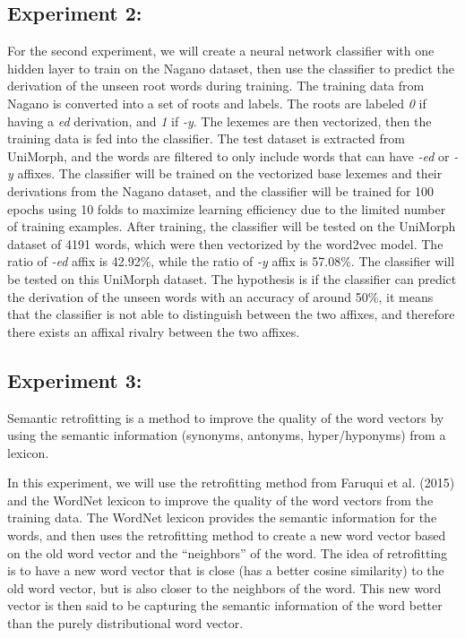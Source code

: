 \documentclass[12pt]{article}
\begin{document}
\subsection{Experiment 2:}
    For the second experiment, we will create a neural network classifier with one hidden layer to train on the Nagano dataset, then use the classifier to predict the derivation of the unseen root words during training. The training data from Nagano is converted into a set of roots and labels. The roots are labeled \emph{0} if having a \emph{ed} derivation, and \emph{1} if \emph{-y}. The lexemes are then vectorized, then the training data is fed into the classifier. The test dataset is extracted from UniMorph, and the words are filtered to only include words that can have \emph{-ed} or \emph{-y} affixes. The classifier will be trained on the vectorized base lexemes and their derivations from the Nagano dataset, and the classifier will be trained for 100 epochs using 10 folds to maximize learning efficiency due to the limited number of training examples. After training, the classifier will be tested on the UniMorph dataset of 4191 words, which were then vectorized by the word2vec model. The ratio of \emph{-ed} affix is 42.92\%, while the ratio of \emph{-y} affix is 57.08\%. The classifier will be tested on this UniMorph dataset. The hypothesis is if the classifier can predict the derivation of the unseen words with an accuracy of around 50\%, it means that the classifier is not able to distinguish between the two affixes, and therefore there exists an affixal rivalry between the two affixes.

\subsection{Experiment 3:}
    Semantic retrofitting is a method to improve the quality of the word vectors by using the semantic information (synonyms, antonyms, hyper/hyponyms) from a lexicon. 

    In this experiment, we will use the retrofitting method from Faruqui et al. (2015) and the WordNet lexicon to improve the quality of the word vectors from the training data. The WordNet lexicon provides the semantic information for the words, and then uses the retrofitting method to create a new word vector based on the old word vector and the ``neighbors'' of the word. The idea of retrofitting is to have a new word vector that is close (has a better cosine similarity) to the old word vector, but is also closer to the neighbors of the word. This new word vector is then said to be capturing the semantic information of the word better than the purely distributional word vector.
\end{document}

